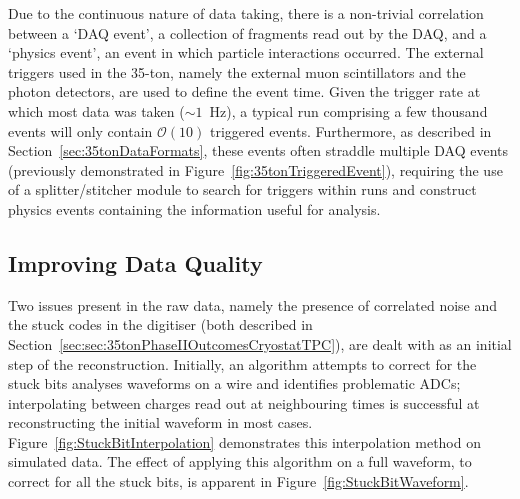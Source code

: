 Due to the continuous nature of data taking, there is a non-trivial correlation between a `DAQ event', a collection of fragments read out by the DAQ, and a `physics event', an event in which particle interactions occurred.  The external triggers used in the 35-ton, namely the external muon scintillators and the photon detectors, are used to define the event time.  Given the trigger rate at which most data was taken ($\sim1$~Hz), a typical run comprising a few thousand events will only contain $\mathcal{O}(10)$ triggered events.  Furthermore, as described in Section~\ref{sec:35tonDataFormats}, these events often straddle multiple DAQ events (previously demonstrated in Figure~\ref{fig:35tonTriggeredEvent}), requiring the use of a splitter/stitcher module to search for triggers within runs and construct physics events containing the information useful for analysis.

\subsection{Improving Data Quality}\label{sec:ImprovingDataQuality}

Two issues present in the raw data, namely the presence of correlated noise and the stuck codes in the digitiser (both described in Section~\ref{sec:sec:35tonPhaseIIOutcomesCryostatTPC}), are dealt with as an initial step of the reconstruction.  Initially, an algorithm attempts to correct for the stuck bits analyses waveforms on a wire and identifies problematic ADCs; interpolating between charges read out at neighbouring times is successful at reconstructing the initial waveform in most cases.  Figure~\ref{fig:StuckBitInterpolation} demonstrates this interpolation method on simulated data.  The effect of applying this algorithm on a full waveform, to correct for all the stuck bits, is apparent in Figure~\ref{fig:StuckBitWaveform}.

